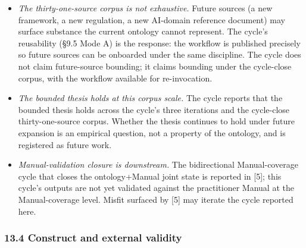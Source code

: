 \documentclass[
]{article}
\providecommand{\tightlist}{%
  \setlength{\itemsep}{0pt}\setlength{\parskip}{0pt}}
\begin{document}
\begin{itemize}
\tightlist
\item
  \emph{The thirty-one-source corpus is not exhaustive.} Future sources
  (a new framework, a new regulation, a new AI-domain reference
  document) may surface substance the current ontology cannot represent.
  The cycle's reusability (§9.5 Mode A) is the response: the workflow is
  published precisely so future sources can be onboarded under the same
  discipline. The cycle does not claim future-source bounding; it claims
  bounding under the cycle-close corpus, with the workflow available for
  re-invocation.
\item
  \emph{The bounded thesis holds at this corpus scale.} The cycle
  reports that the bounded thesis holds across the cycle's three
  iterations and the cycle-close thirty-one-source corpus. Whether the
  thesis continues to hold under future expansion is an empirical
  question, not a property of the ontology, and is registered as future
  work.
\item
  \emph{Manual-validation closure is downstream.} The bidirectional
  Manual-coverage cycle that closes the ontology+Manual joint state is
  reported in {[}5{]}; this cycle's outputs are not yet validated
  against the practitioner Manual at the Manual-coverage level. Misfit
  surfaced by {[}5{]} may iterate the cycle reported here.
\end{itemize}

\subsubsection{13.4 Construct and external
validity}\label{construct-and-external-validity}
\end{document}
